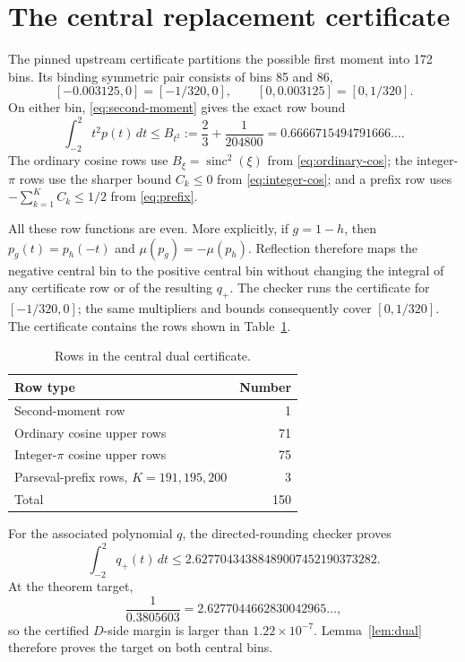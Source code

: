 \documentclass[11pt]{amsart}
\DeclareMathOperator{\sinc}{sinc}
\newcommand{\dd}{\,d}
\begin{document}
\section{The central replacement certificate}

The pinned upstream certificate partitions the possible first moment into 172
bins.  Its binding symmetric pair consists of bins 85 and 86,
\[
 [-0.003125,0]=[-1/320,0],\qquad
 [0,0.003125]=[0,1/320].
\]
On either bin, \eqref{eq:second-moment} gives the exact row bound
\begin{equation}\label{eq:central-second-moment}
 \int_{-2}^2t^2p(t)\dd t
 \le B_{t^2}:=\frac23+\frac1{204800}
 =0.6666715494791666\ldots.
\end{equation}
The ordinary cosine rows use $B_\xi=\sinc^2(\xi)$ from
\eqref{eq:ordinary-cos}; the integer-$\pi$ rows use the sharper bound
$C_k\le0$ from \eqref{eq:integer-cos}; and a prefix row uses
$-\sum_{k=1}^K C_k\le1/2$ from \eqref{eq:prefix}.

All these row functions are even.  More explicitly, if $g=1-h$, then
$p_g(t)=p_h(-t)$ and $\mu(p_g)=-\mu(p_h)$.  Reflection therefore maps the
negative central bin to the positive central bin without changing the
integral of any certificate row or of the resulting $q_+$.  The checker runs
the certificate for $[-1/320,0]$; the same multipliers and bounds consequently
cover $[0,1/320]$.  The certificate contains the rows shown in
Table~\ref{tab:rows}.

\begin{table}[ht]
\centering
\begin{tabular}{lr}
\toprule
Row type & Number \\
\midrule
Second-moment row & 1 \\
Ordinary cosine upper rows & 71 \\
Integer-$\pi$ cosine upper rows & 75 \\
Parseval-prefix rows, $K=191,195,200$ & 3 \\
\midrule
Total & 150 \\
\bottomrule
\end{tabular}
\caption{Rows in the central dual certificate.}
\label{tab:rows}
\end{table}

For the associated polynomial $q$, the directed-rounding checker proves
\begin{equation}\label{eq:central-D}
 \int_{-2}^2 q_+(t)\dd t
 \le 2.62770434388489007452190373282.
\end{equation}
At the theorem target,
\[
 \frac1{0.3805603}
 =2.6277044662830042965\ldots,
\]
so the certified $D$-side margin is larger than $1.22\times10^{-7}$.
Lemma~\ref{lem:dual} therefore proves the target on both central bins.
\end{document}
